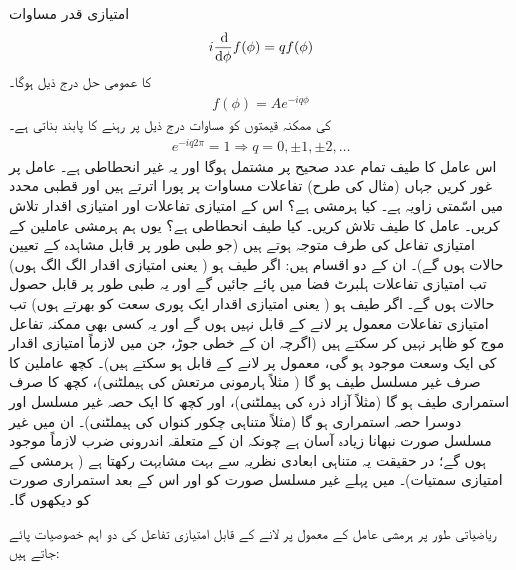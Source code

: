  امتیازی قدر مساوات 
\begin{align}
	i\frac{\dif}{\dif \phi}f(\phi) = qf(\phi)
\end{align}
کا عمومی حل درج ذیل ہوگا۔
\begin{align}
	f(\phi) = Ae^{-iq\phi}
\end{align}
  کی ممکنہ قیمتوں کو مساوات  درج ذیل پر رہنے کا پابند بناتی ہے۔
\begin{align}
	e^{-iq2\pi} = 1 \Rightarrow q = 0, \pm1, \pm2, \dots
\end{align}
اس عامل کا طیف تمام عدد صحیح پر مشتمل ہوگا اور یہ غیر انحطاطی ہے۔
عامل  پر غور کریں جہاں (مثال  کی طرح) تفاعلات مساوات  پر پورا اترتے ہیں اور  قطبی محدد میں اسّمتی زاویہ ہے۔ کیا  ہرمشی ہے؟ اس کے امتیازی تفاعلات اور امتیازی اقدار تلاش کریں۔ عامل  کا طیف تلاش کریں۔ کیا طیف انحطاطی ہے؟
یوں ہم ہرمشی عاملین کے امتیازی تفاعل کی طرف متوجہ ہوتے ہیں (جو طبی طور پر قابل مشاہدہ کے تعیین حالات ہوں گے)۔ ان کے دو اقسام ہیں: اگر طیف  ہو ( یعنی امتیازی اقدار الگ الگ ہوں) تب امتیازی تفاعلات ہلبرٹ فضا میں پائے جائیں گے اور یہ طبی طور پر قابل حصول حالات ہوں گے۔ اگر طیف  ہو ( یعنی امتیازی اقدار ایک پوری سعت کو بھرتے ہوں) تب امتیازی تفاعلات معمول پر لانے کے قابل نہیں ہوں گے اور یہ کسی بھی ممکنہ تفاعل موج کو ظاہر نہیں کر سکتے ہیں (اگرچہ ان کے خطی جوڑ، جن میں لازماً امتیازی اقدار کی ایک وسعت موجود ہو گی، معمول پر لانے کے قابل ہو سکتے ہیں)۔ کچھ عاملین کا صرف غیر مسلسل طیف ہو گا ( مثلاً ہارمونی مرتعش کی ہیملٹنی)، کچھ کا صرف استمراری طیف ہو گا (مثلاً آزاد ذرہ کی ہیملٹنی)، اور کچھ کا ایک حصہ غیر مسلسل اور دوسرا حصہ استمراری ہو گا (مثلاً متناہی چکور کنواں کی ہیملٹنی)۔ ان میں غیر مسلسل صورت نبھانا زیادہ آسان ہے چونکہ ان کے متعلقہ اندرونی ضرب لازماً موجود ہوں گے؛ در حقیقت یہ متناہی ابعادی نظریہ سے بہت مشابہت رکھتا ہے ( ہرمشی  کے امتیازی سمتیات)۔ میں پہلے غیر مسلسل صورت کو اور اس کے بعد استمراری صورت کو دیکھوں گا۔ 

ریاضیاتی طور پر ہرمشی عامل کے معمول پر لانے کے قابل امتیازی تفاعل کی دو اہم خصوصیات پائے جاتے ہیں:
 
